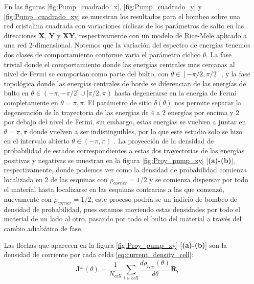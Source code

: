 En las figuras \ref{fig:Pump_cuadrado_x}, \ref{fig:Pump_cuadrado_y} y \ref{fig:Pump_cuadrado_xy} se muestran los resultados para el bombeo sobre una red cristalina cuadrada con variaciones cíclicas de los parámetros de salto en las direcciones \textbf{X}, \textbf{Y} y \textbf{XY}, respectivamente con un modelo de Rice-Mele aplicado a una red 2-dimensional. Notemos que la variación del espectro de energías tenemos dos clases de comportamiento conforme varia el parámetro cíclico $\theta$. La fase trivial donde el comportamiento donde las energías centrales mas cercanas al nivel de Fermi se comportan como parte del bulto, con $\theta \in [-\pi/2, \pi/2]$, y la fase topológica donde las energías centrales de borde se diferencian de las energías de bulto en $\theta \in (-\pi,-\pi/2] \cup [\pi/2,\pi)$ hasta degenerarse en la energía de Fermi completamente en $\theta = \pi,\pi$. El parámetro de sitio $\delta(\theta)$ nos permite separar la degeneración de la trayectoria de las energías de 4 a 2 energías por encima y 2 por debajo del nivel de Fermi, sin embargo, estas energías se vuelven a juntar en $\theta = \pi,\pi$ donde vuelven a ser indistinguibles, por lo que este estudio solo se hizo en el intervalo abierto $\theta \in (-\pi,\pi)$ . 
La proyección de la densidad de probabilidad de estados correspondientes a estas dos trayectorias de las energías positivas y negativas se muestran en la figura \ref{fig:Proy_pump_xy} [\textbf{(a)-(b)}], respectivamente, donde podemos ver como la densidad de probabilidad comienza localizada en 2 de las esquinas con $\rho_{corner} = 1/2$ y se comienza dispersar por todo el material hasta localizarse en las esquinas contrarias a las que comenzó, nuevamente con $\rho_{corner} = 1/2$, este proceso podría se un indicio de bombeo de densidad de probabilidad, pues estamos moviendo estas densidades por todo el material de un lado al otro, pasando por todo el bulto del material a través del cambio adiabático de fase. 

Las flechas que aparecen en la figura \ref{fig:Proy_pump_xy} [\textbf{(a)-(b)}] son la densidad de corriente por cada celda \ref{eq:current_density_cell}:
\begin{equation}
    \label{eq:current_density_cell}
    \mathbf{J}^{\pm}(\theta) = \frac{1}{N_{cell}}\sum_{i \in cell} \frac{d \rho_{i,\pm}(\theta)}{d\theta} \mathbf{R}_i  
\end{equation}

